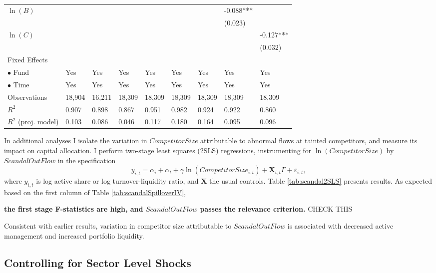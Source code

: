 \documentclass[openany]{book}
\theoremstyle{definition}
\theoremstyle{definition}
\theoremstyle{definition}
\theoremstyle{remark}
\begin{document}
\begin{table}[ht]
\begin{tabularx}{0.975\textwidth}{lYYYYYYYY}
  $\ln(B)$ &  &  &  &  &  &  & -0.088*** &  \\ 
   &  &  &  &  &  &  & (0.023) &  \\ 
  $\ln(C)$ &  &  &  &  &  &  &  & -0.127*** \\ 
   &  &  &  &  &  &  &  & (0.032) \\ 
  Fixed Effects &  &  &  &  &  &  &  &  \\ 
  $\bullet$ Fund & Yes & Yes & Yes & Yes & Yes & Yes & Yes & Yes \\ 
  $\bullet$ Time & Yes & Yes & Yes & Yes & Yes & Yes & Yes & Yes \\ 
  Observations & 18,904 & 16,211 & 18,309 & 18,309 & 18,309 & 18,309 & 18,309 & 18,309 \\ 
  $R^2$ & 0.907 & 0.898 & 0.867 & 0.951 & 0.982 & 0.924 & 0.922 & 0.860 \\ 
  $R^2$ (proj. model) & 0.103 & 0.086 & 0.046 & 0.117 & 0.180 & 0.164 & 0.095 & 0.096 \\ 
   \bottomrule
\end{tabularx}
\endgroup
\end{table}

In additional analyses I isolate the variation in \(CompetitorSize\)
attributable to abnormal flows at tainted competitors, and measure its
impact on capital allocation. I perform two-stage least squares (2SLS)
regressions, instrumenting for \(\ln(CompetitorSize)\) by
\(ScandalOutFlow\) in the specification \begin{equation}
    y_{i,t}=\alpha_i+\alpha_t + \gamma \ln(CompetitorSize_{i,t}) + \mathbf{X}_{i,t}\Gamma+\varepsilon_{i,t},
\end{equation} where \(y_{i,t}\) is log active share or log
turnover-liquidity ratio, and \(\mathbf{X}\) the usual controls. Table
\ref{tab:scandal2SLS} presents results. As expected based on the first
column of Table \ref{tab:scandalSpilloverIV},

\textbf{the first stage F-statistics are high, and \(ScandalOutFlow\)
passes the relevance criterion.} CHECK THIS

Consistent with earlier results, variation in competitor size
attributable to \(ScandalOutFlow\) is associated with decreased active
management and increased portfolio liquidity.

\subsection{Controlling for Sector Level Shocks}
\end{document}
